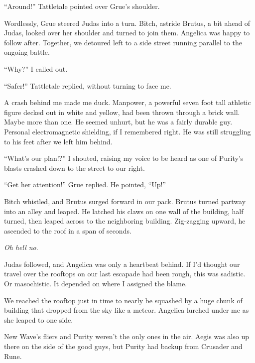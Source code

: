 ``Around!'' Tattletale pointed over Grue's shoulder.



Wordlessly, Grue steered Judas into a turn.  Bitch, astride Brutus, a bit ahead of Judas, looked over her shoulder and turned to join them.  Angelica was happy to follow after.  Together, we detoured left to a side street running parallel to the ongoing battle.



``Why?'' I called out.



``Safer!'' Tattletale replied, without turning to face me.



A crash behind me made me duck.  Manpower, a powerful seven foot tall athletic figure decked out in white and yellow, had been thrown through a brick wall.  Maybe more than one.  He seemed unhurt, but he was a fairly durable guy.  Personal electromagnetic shielding, if I remembered right.  He was still struggling to his feet after we left him behind.



``What's our plan!?'' I shouted, raising my voice to be heard as one of Purity's blasts crashed down to the street to our right.



``Get her attention!'' Grue replied.  He pointed,  ``Up!''



Bitch whistled, and Brutus surged forward in our pack.  Brutus turned partway into an alley and leaped.  He latched his claws on one wall of the building, half turned, then leaped across to the neighboring building.  Zig-zagging upward, he ascended to the roof in a span of seconds.



\emph{Oh hell no}.



Judas followed, and Angelica was only a heartbeat behind.  If I'd thought our travel over the rooftops on our last escapade had been rough, this was sadistic.  Or masochistic.  It depended on where I assigned the blame.



We reached the rooftop just in time to nearly be squashed by a huge chunk of building that dropped from the sky like a meteor.  Angelica lurched under me as she leaped to one side.



New Wave's fliers and Purity weren't the only ones in the air.  Aegis was also up there on the side of the good guys, but Purity had backup from Crusader and Rune.



